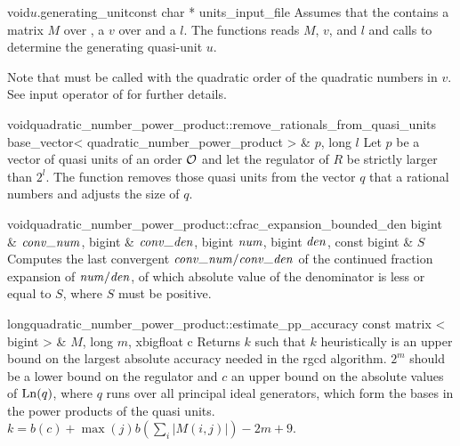 \begin{fcode}{void}{$u$.generating_unit}{const char * units_input_file}
  Assumes that the  contains a matrix $M$ over , a
   $v$ over  and a  $l$.  The
  functions reads $M$, $v$, and $l$ and calls  to
  determine the generating quasi-unit $u$.
  
  Note that  must be called with the quadratic order of the
  quadratic numbers in $v$.  See input operator of  for further
  details.
\end{fcode}

\begin{fcode}{void}{quadratic_number_power_product::remove_rationals_from_quasi_units}{
    base_vector< quadratic_number_power_product > & $p$, long $l$}%
  Let $p$ be a vector of quasi units of an order $\mathcal{O}$ and let the regulator of $R$ be strictly
  larger than $2^l$.  The function removes those quasi units from the vector $q$ that a rational
  numbers and adjusts the size of $q$.
\end{fcode}

\begin{Tfcode}{void}{quadratic_number_power_product::cfrac_expansion_bounded_den}{
    bigint & $\mathit{conv\uscore num}$, bigint & $\mathit{conv\uscore den}$,
    bigint $\mathit{num}$, bigint $\mathit{den}$, const bigint & $S$}%
  Computes the last convergent $\mathit{conv\uscore num} / \mathit{conv\uscore den}$ of the
  continued fraction expansion of $\mathit{num} / \mathit{den}$, of which absolute value of the denominator is
  less or equal to $S$, where $S$ must be positive.
\end{Tfcode}

\begin{Tfcode}{long}{quadratic_number_power_product::estimate_pp_accuracy}{
    const matrix < bigint > & $M$, long $m$, xbigfloat c}%
  Returns $k$ such that $k$ heuristically is an upper bound on the largest absolute accuracy
  needed in the rgcd algorithm.  $2^m$ should be a lower bound on the regulator and $c$ an upper
  bound on the absolute values of $\operatorname{Ln}(q)$, where $q$ runs over all principal ideal generators,
  which form the bases in the power products of the quasi units.  $k = b(c) + \max(j) b(\sum_i
  |M(i,j)|) - 2m + 9$.
\end{Tfcode}



